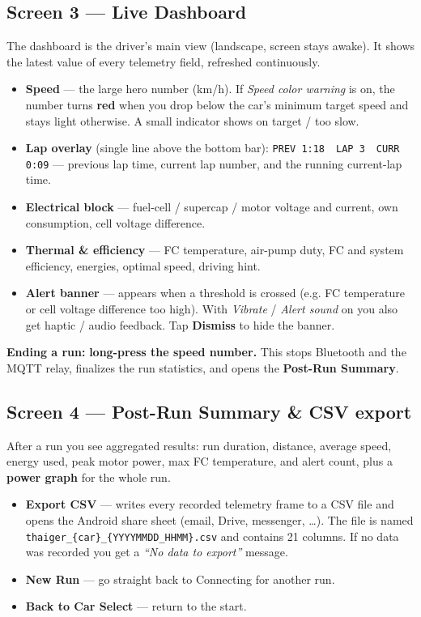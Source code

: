 \documentclass[11pt,a4paper,oneside]{report}
\newcommand{\midsep}{\,\textperiodcentered\,}
\newcommand{\ok}{\textcolor{tgreen}{\ding{51}}}
\newcommand{\nope}{\textcolor{tred}{\ding{55}}}
\newcommand{\code}[1]{\texttt{#1}}
\begin{document}
\subsection{Screen 3 --- Live Dashboard}
The dashboard is the driver's main view (landscape, screen stays awake). It shows
the latest value of every telemetry field, refreshed continuously.
\begin{itemize}
  \item \textbf{Speed} --- the large hero number (km/h). If \emph{Speed color
    warning} is on, the number turns \textbf{red} when you drop below the car's
    minimum target speed and stays light otherwise. A small indicator shows
    \ok{} on target / \nope{} too slow.
  \item \textbf{Lap overlay} (single line above the bottom bar):
    \code{PREV 1:18} \midsep{} \code{LAP 3} \midsep{} \code{CURR 0:09} --- previous
    lap time, current lap number, and the running current-lap time.
  \item \textbf{Electrical block} --- fuel-cell / supercap / motor voltage and
    current, own consumption, cell voltage difference.
  \item \textbf{Thermal \& efficiency} --- FC temperature, air-pump duty, FC and
    system efficiency, energies, optimal speed, driving hint.
  \item \textbf{Alert banner} --- appears when a threshold is crossed (e.g. FC
    temperature or cell voltage difference too high). With \emph{Vibrate} /
    \emph{Alert sound} on you also get haptic / audio feedback. Tap
    \textbf{Dismiss} to hide the banner.
\end{itemize}
\begin{tgnote}
\textbf{Ending a run:} \textbf{long-press the speed number.} This stops Bluetooth
and the MQTT relay, finalizes the run statistics, and opens the \textbf{Post-Run
Summary}.
\end{tgnote}

\subsection{Screen 4 --- Post-Run Summary \& CSV export}
After a run you see aggregated results: run duration, distance, average speed,
energy used, peak motor power, max FC temperature, and alert count, plus a
\textbf{power graph} for the whole run.
\begin{itemize}
  \item \textbf{Export CSV} --- writes every recorded telemetry frame to a CSV
    file and opens the Android share sheet (email, Drive, messenger, \ldots). The
    file is named \code{thaiger\_\{car\}\_\allowbreak\{YYYYMMDD\_HHMM\}.csv} and contains 21
    columns. If no data was recorded you get a \emph{``No data to export''}
    message.
  \item \textbf{New Run} --- go straight back to Connecting for another run.
  \item \textbf{Back to Car Select} --- return to the start.
\end{itemize}
\end{document}
